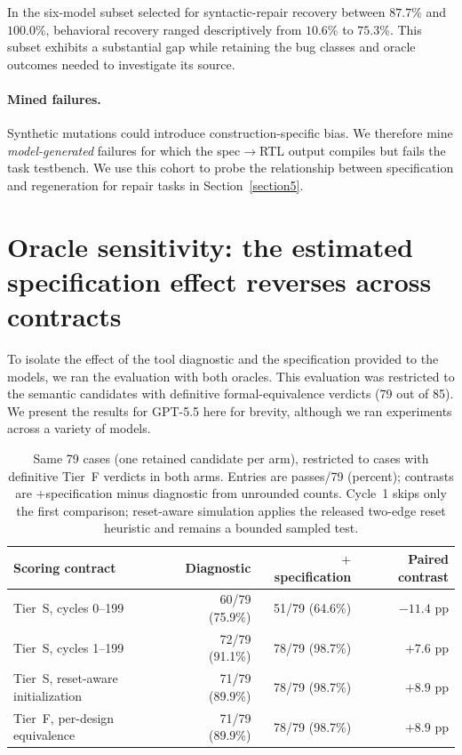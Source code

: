 \documentclass{article}
\renewcommand{\to}{\ensuremath{\rightarrow}}
\begin{document}
In the six-model subset selected for syntactic-repair recovery between $87.7\%$ and $100.0\%$,
behavioral recovery ranged descriptively from $10.6\%$ to $75.3\%$. This subset exhibits a substantial gap
while retaining the bug classes and oracle outcomes needed to investigate its source.

\paragraph{Mined failures.}\label{mined}
Synthetic mutations could introduce construction-specific bias. We therefore mine \emph{model-generated}
failures for which the spec\to RTL output compiles but fails the task testbench. We use this cohort to
probe the relationship between specification and regeneration for repair tasks in
Section~\ref{section5}.

\section{Oracle sensitivity: the estimated specification effect reverses across contracts}

To isolate the effect of the tool diagnostic and the specification provided to the models, we ran
the evaluation with both oracles. This evaluation was restricted to the semantic candidates with
definitive formal-equivalence verdicts (79 out of 85). We present the results for
GPT-5.5 here for brevity, although we ran experiments across a variety of models.

\begin{table}[H]
\centering
\scriptsize
\setlength{\tabcolsep}{3.5pt}
\caption{Same 79 cases (one retained candidate per arm), restricted to cases with definitive Tier~F
verdicts in both arms. Entries are passes/79 (percent); contrasts are $+$specification minus diagnostic
from unrounded counts. Cycle~1 skips only the first comparison; reset-aware simulation applies the
released two-edge reset heuristic and remains a bounded sampled test.}
\label{tab:oracle}
\begin{tabular}{lrrr}
\toprule
Scoring contract & Diagnostic & $+$ specification & Paired contrast \\
\midrule
Tier~S, cycles 0--199 & 60/79 (75.9\%) & 51/79 (64.6\%) & $-11.4$ pp \\
Tier~S, cycles 1--199 & 72/79 (91.1\%) & 78/79 (98.7\%) & $+7.6$ pp \\
Tier~S, reset-aware initialization & 71/79 (89.9\%) & 78/79 (98.7\%) & $+8.9$ pp \\
Tier~F, per-design equivalence & 71/79 (89.9\%) & 78/79 (98.7\%) & $+8.9$ pp \\
\bottomrule
\end{tabular}
\end{table}
\end{document}
